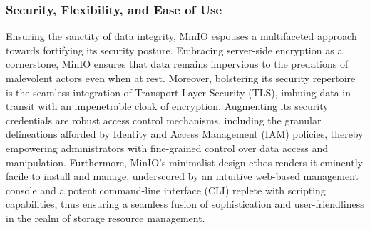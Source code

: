\subsubsection{Security, Flexibility, and Ease of Use}
Ensuring the sanctity of data integrity, MinIO espouses a multifaceted approach
towards fortifying its security posture. Embracing server-side encryption as a
cornerstone, MinIO ensures that data remains impervious to the predations of
malevolent actors even when at rest. Moreover, bolstering its security
repertoire is the seamless integration of Transport Layer Security (TLS),
imbuing data in transit with an impenetrable cloak of encryption. Augmenting its
security credentials are robust access control mechanisms, including the
granular delineations afforded by Identity and Access Management (IAM) policies,
thereby empowering administrators with fine-grained control over data access and
manipulation. Furthermore, MinIO's minimalist design ethos renders it eminently
facile to install and manage, underscored by an intuitive web-based management
console and a potent command-line interface (CLI) replete with scripting
capabilities, thus ensuring a seamless fusion of sophistication and
user-friendliness in the realm of storage resource management.
